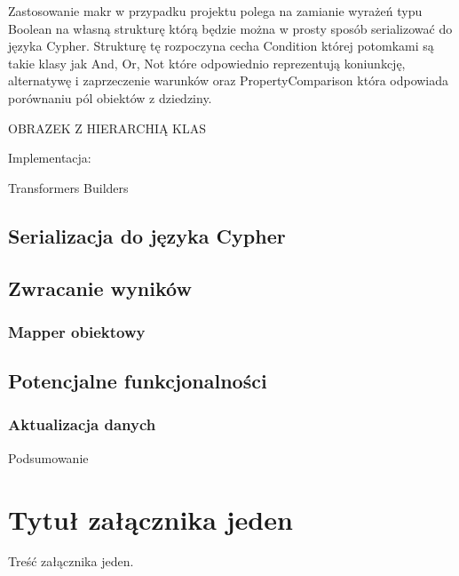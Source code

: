 \documentclass[brudnopis]{xmgr}
\begin{document}
Zastosowanie makr w przypadku projektu polega na zamianie wyrażeń typu Boolean na własną strukturę którą będzie można w prosty sposób serializować do języka Cypher. Strukturę tę rozpoczyna cecha Condition której potomkami są takie klasy jak And, Or, Not które odpowiednio reprezentują koniunkcję, alternatywę i zaprzeczenie warunków oraz PropertyComparison która odpowiada porównaniu pól obiektów z dziedziny.

OBRAZEK Z HIERARCHIĄ KLAS

Implementacja:

Transformers
Builders

\section{Serializacja do języka Cypher}

\section{Zwracanie wyników}

\subsection{Mapper obiektowy}

\section{Potencjalne funkcjonalności}

\subsection{Aktualizacja danych}

\summary
Podsumowanie

\appendix
\chapter{Tytuł załącznika jeden}

Treść załącznika jeden.




\listoftables

\listoffigures

\oswiadczenie
\end{document}
